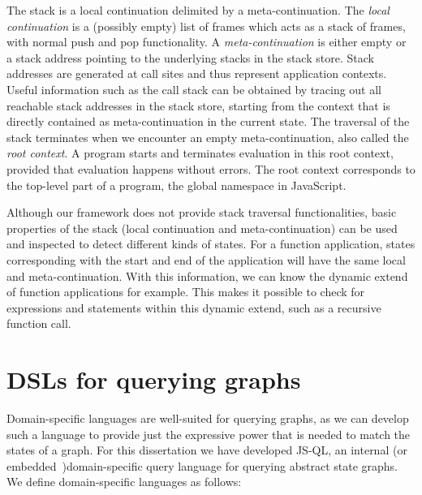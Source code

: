 The stack is a local continuation delimited by a meta-continuation. The \textit{local continuation} is a (possibly empty) list of frames which acts as a stack of frames, with normal push and pop functionality. A \textit{meta-continuation} is either empty or a stack address pointing to the underlying stacks in the stack store. Stack addresses are generated at call sites and thus represent application contexts. Useful information such as the call stack can be obtained by tracing out all reachable stack addresses in the stack store, starting from the context that is directly contained as meta-continuation in the current state. The traversal of the stack terminates when we encounter an empty meta-continuation, also called the \textit{root context}. A program starts and terminates evaluation in this root context, provided that evaluation happens without errors. The root context corresponds to the top-level part of a program, the global namespace in JavaScript.

Although our framework does not provide stack traversal functionalities, basic properties of the stack (local continuation and meta-continuation) can be used and inspected to detect different kinds of states. For a function application, states corresponding with the start and end of the application will have the same local and meta-continuation. With this information, we can know the dynamic extend of function applications for example. This makes it possible to check for expressions and statements within this dynamic extend, such as a recursive function call.

\section{DSLs for querying graphs}
\label{sec:DSLForQueryingGraphs}

Domain-specific languages are well-suited for querying graphs, as we can develop such a language to provide just the expressive power that is needed to match the states of a graph. For this dissertation we have developed JS-QL, an internal (or embedded~\cite{Hudak:1996})domain-specific query language for querying abstract state graphs. We define domain-specific languages as follows:

